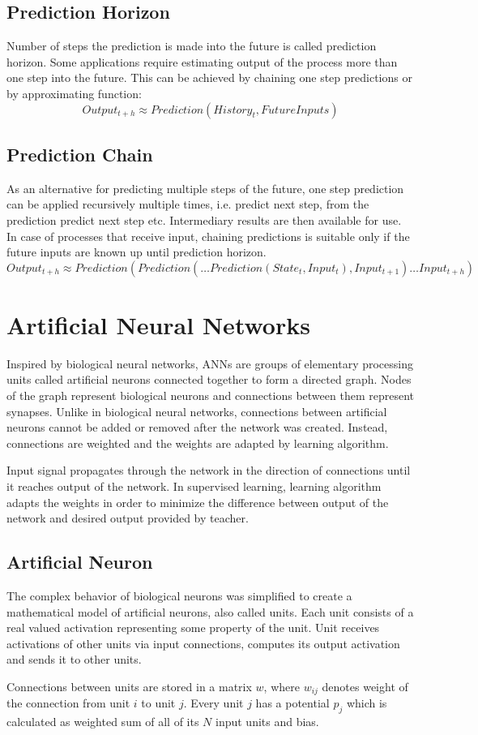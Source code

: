 \documentclass[12pt,oneside]{fithesis2}
\begin{document}
\section{Prediction Horizon}
Number of steps the prediction is made into the future is called prediction horizon. Some applications require estimating output of the process more than one step into the future. This can be achieved by chaining one step predictions or by approximating function:
	$$Output_{t+h} \approx Prediction( History_t, FutureInputs )$$

\section{Prediction Chain}
As an alternative for predicting multiple steps of the future, one step prediction can be applied recursively multiple times, i.e. predict next step, from the prediction predict next step etc. Intermediary results are then available for use. In case of processes that receive input, chaining predictions is suitable only if the future inputs are known up until prediction horizon.
$$Output_{t+h} \approx Prediction( Prediction(  \dots Prediction(State_t, Input_t), Input_{t+1} ) \dots Input_{t+h} )$$


\chapter{Artificial Neural Networks}
Inspired by biological neural networks, ANNs are groups of elementary processing units called artificial neurons connected together to form a directed graph. Nodes of the graph represent biological neurons and connections between them represent synapses. Unlike in biological neural networks, connections between artificial neurons cannot be added or removed after the network was created. Instead, connections are weighted and the weights are adapted by learning algorithm. \par

Input signal propagates through the network in the direction of connections until it reaches output of the network. In supervised learning, learning algorithm adapts the weights in order to minimize the difference between output of the network and desired output provided by teacher.

\section{Artificial Neuron}
The complex behavior of biological neurons was simplified to create a mathematical model of artificial neurons, also called units. Each unit consists of a real valued activation representing some property of the unit. Unit receives activations of other units via input connections, computes its output activation and sends it to other units. \par
Connections between units are stored in a matrix $w$, where $w_{ij}$ denotes weight of the connection from unit $i$ to unit $j$. Every unit $j$ has a potential $p_j$ which is calculated as weighted sum of all of its $N$ input units and bias. \par
\end{document}
